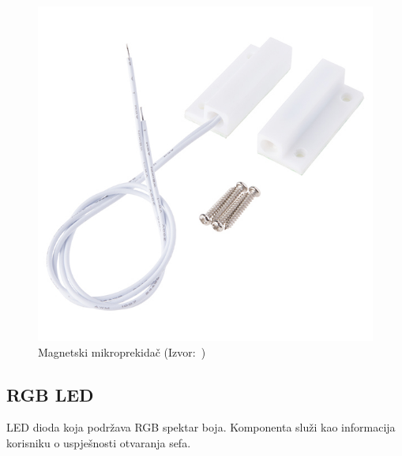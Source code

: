 \begin{figure}[h!]
    \centering
    \includegraphics{images/magnetic-switch}
    \caption{Magnetski mikroprekidač (Izvor:~\cite{sparkfun-switch})}
\end{figure}

\pagebreak

\subsection{RGB LED}

LED dioda koja podržava RGB spektar boja.
Komponenta služi kao informacija korisniku o uspješnosti otvaranja sefa.


